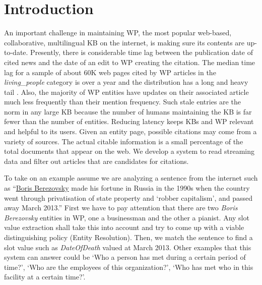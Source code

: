 
\section{Introduction}

 An important challenge in maintaining WP, the most popular web-based, collaborative, multilingual KB on the internet, is making sure its contents are up-to-date. Presently, there is considerable time lag between the publication date of cited news and the date of an edit to WP creating the citation. The median time lag for a sample of about 60K web pages cited by WP articles in the \textit{living\_people} category is over a year and the distribution has a long and heavy tail \cite{JFrank12}. Also, the majority of WP entities have updates on their associated article much less frequently than their mention frequency. Such stale entries are the norm in any large KB because the number of humans maintaining the KB is far fewer than the number of entities. %
Reducing latency keeps KBs and WP relevant and helpful to its users. Given an entity page, possible citations may come from a variety of sources. The actual citable information is a small percentage of the total documents that appear on the web. We develop a system to read streaming data and filter out articles that are candidates for citations. 

To take on an example assume we are analyzing a sentence from the internet such as ``\underline{Boris Berezovsky} made his fortune in Russia in the 1990s when the country went through privatisation of state property and `robber capitalism', and passed away March 2013.''  First we have to pay attemtion that there are two \textit{Boris Berezovsky} entities in WP, one a businessman and the other a pianist. Any slot value extraction shall take this into account and try to come up with a viable distinguishing policy (Entity Resolution). Then, we match the sentence to find a slot value such as \textit{DateOfDeath} valued at March 2013. Other examples that this system can answer could be `Who a person has met during a certain period of time?', `Who are the employees of this organization?', `Who has met who in this facility at a certain time?'.

